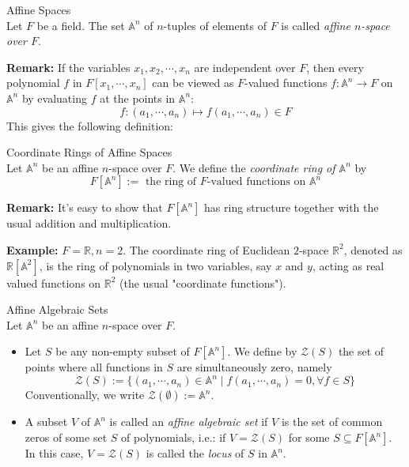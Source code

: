 \begin{definition}{Affine Spaces}\\
Let $F$ be a field. The set $\mathbb{A}^n$ of $n$-tuples of elements of $F$ is called \textit{affine $n$-space over $F$}.
\end{definition}

\noindent\textbf{Remark:} If the variables $x_1 ,x_2, \cdots, x_n$ are independent over $F$, then every polynomial $f$ in $F[x_1 ,\cdots, x_n]$ can be viewed as $F$-valued functions $f : \mathbb{A}^n \to F$ on $\mathbb{A}^n$ by evaluating $f$ at the points in $\mathbb{A}^n$:
$$f: (a_1, \cdots, a_n) \mapsto f(a_1 ,\cdots, a_n) \in F$$
This gives the following definition:

\begin{definition}{Coordinate Rings of Affine Spaces}\\
Let $\mathbb{A}^n$ be an affine $n$-space over $F$. We define the \textit{coordinate ring of $\mathbb{A}^n$} by
$$F[\mathbb{A}^n] := \text{ the ring of }F \text{-valued functions on } \mathbb{A}^n$$
\end{definition}

\noindent\textbf{Remark:} It's easy to show that $F[\mathbb{A}^n]$ has ring structure together with the usual addition and multiplication.

\noindent\textbf{Example:} $F= \mathbb{R}, n=2$. The coordinate ring of Euclidean $2$-space $\mathbb{R}^2$, denoted as $\mathbb{R}[\mathbb{A}^2]$, is the ring of polynomials in two variables, say $x$ and $y$, acting as real valued functions on $\mathbb{R}^2$ (the usual "coordinate functions").

\begin{definition}{Affine Algebraic Sets}\\
Let $\mathbb{A}^n$ be an affine $n$-space over $F$.
\begin{itemize}
    \item Let $S$ be any non-empty subset of $F [\mathbb{A}^n]$. We define by $\mathcal{Z} (S)$ the set of points where all functions in $S$ are simultaneously zero, namely
    $$\mathcal{Z} (S) := \{ (a_1 ,\cdots, a_n) \in \mathbb{A}^n \mid f(a_1 ,\cdots, a_n) =0 ,\forall f\in S \}$$
    Conventionally, we write $\mathcal{Z} (\emptyset) :=\mathbb{A}^n$.

    \item A subset $V$ of $\mathbb{A}^n$ is called an \textit{affine algebraic set} if $V$ is the set of common zeros of some set $S$ of polynomials, i.e.: if $V= \mathcal{Z}(S)$ for some $S \subseteq F[\mathbb{A}^n]$. In this case, $V=\mathcal{Z}(S)$ is called the \textit{locus} of $S$ in $\mathbb{A}^n$.
\end{itemize}
\end{definition}

